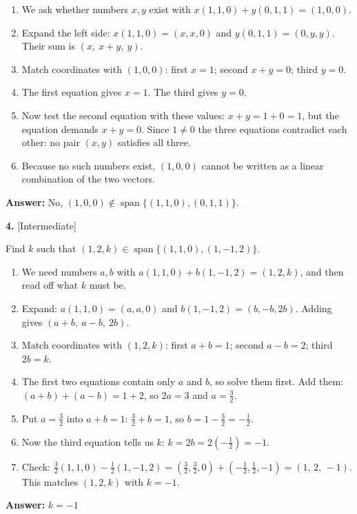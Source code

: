 \documentclass[11pt]{article}
\begin{document}
\begin{tcolorbox}[breakable,colback=ans,colframe=ansb,boxrule=0.5pt,left=4pt,right=4pt,top=2pt,bottom=2pt]\begin{enumerate}[leftmargin=2.2em,itemsep=1pt,topsep=1pt,label=\textbf{Step \arabic*.}]\item We ask whether numbers $x,y$ exist with $x(1,1,0)+y(0,1,1)=(1,0,0)$.
\item Expand the left side: $x(1,1,0)=(x,x,0)$ and $y(0,1,1)=(0,y,y)$. Their sum is $(x,\ x+y,\ y)$.
\item Match coordinates with $(1,0,0)$: first $x=1$; second $x+y=0$; third $y=0$.
\item The first equation gives $x=1$. The third gives $y=0$.
\item Now test the second equation with these values: $x+y=1+0=1$, but the equation demands $x+y=0$. Since $1\ne0$ the three equations contradict each other: no pair $(x,y)$ satisfies all three.
\item Because no such numbers exist, $(1,0,0)$ cannot be written as a linear combination of the two vectors.
\end{enumerate}\textbf{Answer:} No, $(1,0,0)\notin\operatorname{span}\{(1,1,0),(0,1,1)\}$.\end{tcolorbox}
\par\vspace{2pt}
\begin{minipage}{\linewidth}\textbf{4.} \hfill{\scriptsize\color{ink}[Intermediate]}\par\nopagebreak Find $k$ such that $(1,2,k)\in\operatorname{span}\{(1,1,0),(1,-1,2)\}$.
\end{minipage}\par\nopagebreak
\begin{tcolorbox}[breakable,colback=ans,colframe=ansb,boxrule=0.5pt,left=4pt,right=4pt,top=2pt,bottom=2pt]\begin{enumerate}[leftmargin=2.2em,itemsep=1pt,topsep=1pt,label=\textbf{Step \arabic*.}]\item We need numbers $a,b$ with $a(1,1,0)+b(1,-1,2)=(1,2,k)$, and then read off what $k$ must be.
\item Expand: $a(1,1,0)=(a,a,0)$ and $b(1,-1,2)=(b,-b,2b)$. Adding gives $(a+b,\ a-b,\ 2b)$.
\item Match coordinates with $(1,2,k)$: first $a+b=1$; second $a-b=2$; third $2b=k$.
\item The first two equations contain only $a$ and $b$, so solve them first. Add them: $(a+b)+(a-b)=1+2$, so $2a=3$ and $a=\tfrac32$.
\item Put $a=\tfrac32$ into $a+b=1$: $\tfrac32+b=1$, so $b=1-\tfrac32=-\tfrac12$.
\item Now the third equation tells us $k$: $k=2b=2\left(-\tfrac12\right)=-1$.
\item Check: $\tfrac32(1,1,0)-\tfrac12(1,-1,2)=\left(\tfrac32,\tfrac32,0\right)+\left(-\tfrac12,\tfrac12,-1\right)=(1,\,2,\,-1)$. This matches $(1,2,k)$ with $k=-1$.
\end{enumerate}\textbf{Answer:} $k=-1$\end{tcolorbox}
\end{document}
